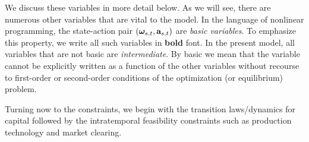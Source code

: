 \documentclass[12pt,a4paper,twoside, draft]{article}
\begin{document}
We discuss these variables in more detail below.
As we will see, there are numerous other variables that are vital to the
model. 
In the language of nonlinear programming, the state-action pair
$(\boldsymbol{\omega}_{{s}, t}, \mathbf{a}_{{s}, t})$
are \emph{basic variables}.
To emphasize this property, we write all such variables in \textbf{bold} font.
In the present model, all variables that are not basic are \emph{intermediate}.
By basic we mean that the variable cannot be explicitly
written as a function of the other variables without recourse to
first-order or second-order conditions of the optimization (or equilibrium)
problem.

Turning now to the constraints, we begin with the transition laws/dynamics for
capital followed by the intratemporal feasibility constraints such as
production technology and market clearing.
\end{document}

